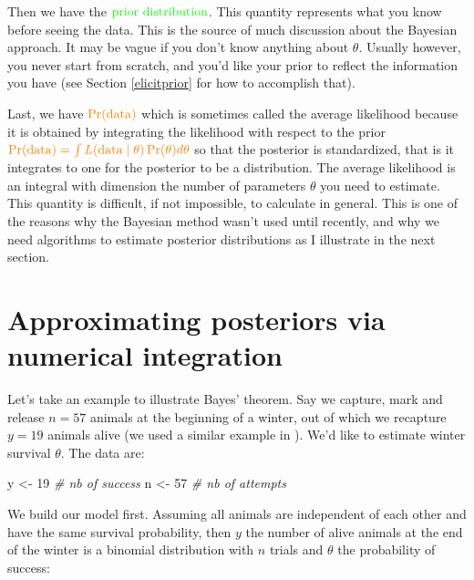 \documentclass[
  12pt,
]{krantz}
\newenvironment{Shaded}{\begin{snugshade}}{\end{snugshade}}
\newcommand{\CommentTok}[1]{\textcolor[rgb]{0.56,0.35,0.01}{\textit{#1}}}
\newcommand{\DecValTok}[1]{\textcolor[rgb]{0.00,0.00,0.81}{#1}}
\newcommand{\NormalTok}[1]{#1}
\newcommand{\OtherTok}[1]{\textcolor[rgb]{0.56,0.35,0.01}{#1}}
\begin{document}
Then we have the \(\color{green}{\text{prior distribution}}\). This quantity represents what you know before seeing the data. This is the source of much discussion about the Bayesian approach. It may be vague if you don't know anything about \(\theta\). Usually however, you never start from scratch, and you'd like your prior to reflect the information you have (see Section \ref{elicitprior} for how to accomplish that).

Last, we have \(\color{orange}{\Pr(\text{data})}\) which is sometimes called the average likelihood because it is obtained by integrating the likelihood with respect to the prior \(\color{orange}{\Pr(\text{data}) = \int{L(\text{data} \mid \theta)\Pr(\theta) d\theta}}\) so that the posterior is standardized, that is it integrates to one for the posterior to be a distribution. The average likelihood is an integral with dimension the number of parameters \(\theta\) you need to estimate. This quantity is difficult, if not impossible, to calculate in general. This is one of the reasons why the Bayesian method wasn't used until recently, and why we need algorithms to estimate posterior distributions as I illustrate in the next section.

\section{Approximating posteriors via numerical integration}\label{numerical-approx}

Let's take an example to illustrate Bayes' theorem. Say we capture, mark and release \(n = 57\) animals at the beginning of a winter, out of which we recapture \(y = 19\) animals alive (we used a similar example in \citet{king_bayesian_2009}). We'd like to estimate winter survival \(\theta\). The data are:

\begin{Shaded}
\begin{Highlighting}[]
\NormalTok{y }\OtherTok{\textless{}{-}} \DecValTok{19} \CommentTok{\# nb of success}
\NormalTok{n }\OtherTok{\textless{}{-}} \DecValTok{57} \CommentTok{\# nb of attempts}
\end{Highlighting}
\end{Shaded}

We build our model first. Assuming all animals are independent of each other and have the same survival probability, then \(y\) the number of alive animals at the end of the winter is a binomial distribution with \(n\) trials and \(\theta\) the probability of success:
\end{document}

